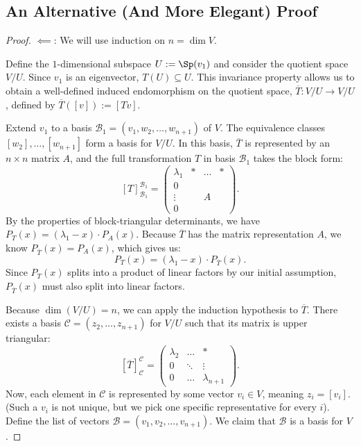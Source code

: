 \subsection{An Alternative (And More Elegant) Proof}

\begin{proof}
  $\impliedby$: We will use induction on $n = \dim V$.

  Define the $1$-dimensional subspace $U := \Sp(v_1)$ and consider the quotient space $V/U$. Since $v_1$ is an eigenvector, $T(U) \subseteq U$. This invariance property allows us to obtain a well-defined induced endomorphism on the quotient space, $\overline{T} : V/U \rightarrow V/U$, defined by $\overline{T}([v]) := [Tv]$.

  Extend $v_1$ to a basis $\mathcal{B}_1 = (v_1, w_2, \dots, w_{n+1})$ of $V$.
  The equivalence classes $[w_2], \dots, [w_{n+1}]$ form a basis for $V/U$. In this basis, $\overline{T}$ is represented by an $n \times n$ matrix $A$, and the full transformation $T$ in basis $\mathcal{B}_1$ takes the block form:
  \begin{equation} \label{eq:block_matrix_induction}
    [T]_{\mathcal{B}_1}^{\mathcal{B}_1} = \left(\begin{array}{c|ccc} \lambda_1 & * & \dots & * \\ \hline 0 & & & \\ \vdots & & A & \\ 0 & & & \end{array}\right).
  \end{equation}
  By the properties of block-triangular determinants, we have $P_T(x) = (\lambda_1 - x) \cdot P_A(x)$. Because $\overline{T}$ has the matrix representation $A$, we know $P_{\overline{T}}(x) = P_A(x)$, which gives us:
  \[ P_T(x) = (\lambda_1 - x) \cdot P_{\overline{T}}(x). \]
  Since $P_T(x)$ splits into a product of linear factors by our initial assumption, $P_{\overline{T}}(x)$ must also split into linear factors.

  Because $\dim(V/U) = n$, we can apply the induction hypothesis to $\overline{T}$. There exists a basis $\mathcal{C} = (z_2, \dots, z_{n+1})$ for $V/U$ such that its matrix is upper triangular:
  \begin{equation} \label{eq:quotient_upper_triangular}
    [\overline{T}]_{\mathcal{C}}^{\mathcal{C}} = \begin{pmatrix} \lambda_2 & \dots & * \\ 0 & \ddots & \vdots \\ 0 & \dots & \lambda_{n+1} \end{pmatrix}.
  \end{equation}
  Now, each element in $\mathcal{C}$ is represented by some vector $v_i \in V$, meaning $z_i = [v_i]$. (Such a $v_i$ is not unique, but we pick one specific representative for every $i$).
  Define the list of vectors $\mathcal{B} = (v_1, v_2, \dots, v_{n+1})$. We claim that $\mathcal{B}$ is a basis for $V$.


\end{proof}
